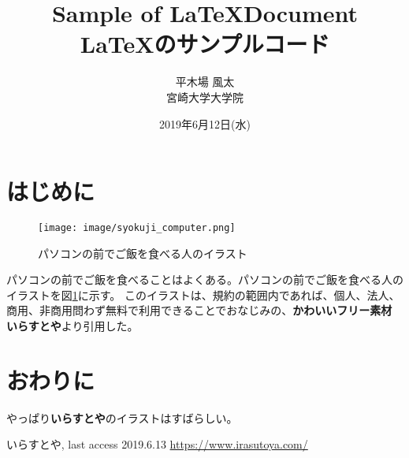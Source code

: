 \documentclass[uplatex, twocolumn,10pt]{jsarticle}
\begin{document}
\title{\bf{\LARGE{Sample of \LaTeX  Document} \\ \Large{\LaTeX のサンプルコード}}}
\author{平木場 風太\\宮崎大学大学院}
\date{2019年6月12日(水)}
\maketitle


\section{はじめに}
\begin{figure}[t]
    \begin{center}
        \texttt{[image: image/syokuji\_computer.png]}
        \caption{パソコンの前でご飯を食べる人のイラスト}
        \label{fig:syokuji_computer}
    \end{center}
\end{figure}

パソコンの前でご飯を食べることはよくある。パソコンの前でご飯を食べる人のイラストを図\ref{fig:syokuji_computer}に示す。
このイラストは、規約の範囲内であれば、個人、法人、商用、非商用問わず無料で利用できることでおなじみの、{\bf かわいいフリー素材 いらすとや}\cite{irasutoya}より引用した。

\section{おわりに}
やっぱり{\bf いらすとや}のイラストはすばらしい。

\begin{thebibliography}{99}
     いらすとや, last access 2019.6.13 \url{https://www.irasutoya.com/}



\end{thebibliography}
\end{document}
